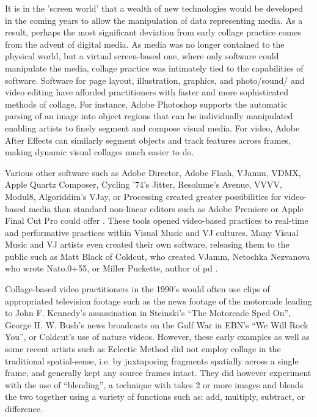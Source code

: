 \documentclass[a4paper,11pt,final]{ThesisStyle}
\begin{document}
It is in the 'screen world' that a wealth of new technologies would be developed in the coming years to allow the manipulation of data representing media.  As a result, perhaps the most significant deviation from early collage practice comes from the advent of digital media.  As media was no longer contained to the physical world, but a virtual screen-based one, where only software could manipulate the media, collage practice was intimately tied to the capabilities of software.  Software for page layout, illustration, graphics, and photo/sound/ and video editing have afforded practitioners with faster and more sophisticated methods of collage.  For instance, Adobe Photoshop supports the automatic parsing of an image into object regions that can be individually manipulated enabling artists to finely segment and compose visual media.  For video, Adobe After Effects can similarly segment objects and track features across frames, making dynamic visual collages much easier to do.  

Various other software such as Adobe Director, Adobe Flash, VJamm, VDMX, Apple Quartz Composer, Cycling '74's Jitter, Resolume's Avenue, VVVV, Modul8, Algoriddim's VJay, or Processing created greater possibilities for video-based media than standard non-linear editors such as Adobe Premiere or Apple Final Cut Pro could offer \cite{Jaeger2006}.  These tools opened video-based practices to real-time and performative practices within Visual Music and VJ cultures.  Many Visual Music and VJ artists even created their own software, releasing them to the public such as Matt Black of Coldcut, who created VJamm, Netochka Nezvanova who wrote Nato.0+55, or Miller Puckette, author of pd \cite{Jaeger2006}.  %


Collage-based video practitioners in the 1990's would often use clips of appropriated television footage such as the news footage of the motorcade leading to John F. Kennedy's assassination in Steinski's ``The Motorcade Sped On'', George H. W. Bush's news broadcasts on the Gulf War in EBN's ``We Will Rock You'', or Coldcut's use of nature videos.  However, these early examples as well as some recent artists such as Eclectic Method did not employ collage in the traditional spatial-sense, i.e. by juxtaposing fragments spatially across a single frame, and generally kept any source frames intact.  They did however experiment with the use of ``blending'', a technique with takes 2 or more images and blends the two together using a variety of functions such as: add, multiply, subtract, or difference.  
\end{document}
